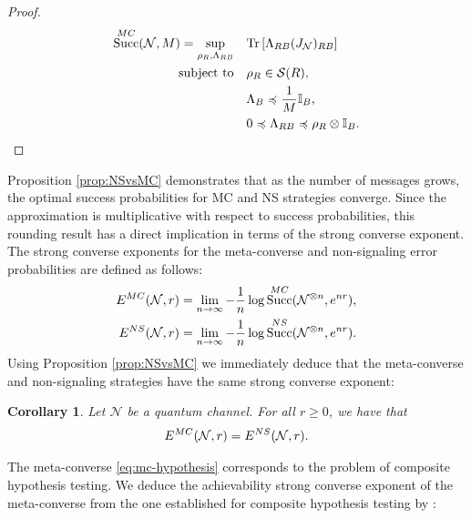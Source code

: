 \documentclass[a4paper,onecolumn,11pt,accepted=2025-10-01]{quantumarticle}
\newtheorem{cor}[theorem]{Corollary}
\DeclareMathOperator{\suc}{Succ}
\newcommand*{\cN}{\mathcal{N}}
\newcommand*{\cS}{\mathcal{S}}
\newcommand*{\tr}[1]{\mathrm{Tr}\left[#1\right]}
\newcommand*{\mle}{\preccurlyeq}
\begin{document}
\begin{proof}
\begin{align}
    \suc^{\rm{MC}}(\cN, M) = \sup_{\rho_R, \Lambda_{RB}} \quad & \tr{\Lambda_{RB} (J_{\cN})_{RB}} \notag \\
\text{subject to} \quad
& \rho_R \in \cS(R), \notag \\
& \Lambda_B \mle   \frac{1}{M} \mathbb{I}_B, \notag \\
& 0 \mle \Lambda_{RB} \mle  \rho_R \otimes \mathbb{I}_B.
\end{align}
\end{proof}
Proposition \ref{prop:NSvsMC} demonstrates that as the number of messages grows, the optimal success probabilities for MC and NS strategies converge. Since the approximation is multiplicative with respect to success probabilities, this rounding result has a direct implication  in terms of the strong converse exponent. The strong converse exponents for the meta-converse and non-signaling error probabilities are defined as follows:
\begin{align}
E^{\rm{MC}}(\cN, r) &= \lim_{n\rightarrow \infty } - \frac{1}{n}\log \suc^{\rm{MC}}(\cN^{\otimes n}, e^{nr}),
 \\E^{\rm{NS}}(\cN, r) &= \lim_{n\rightarrow \infty } - \frac{1}{n}\log\suc^{\rm{NS}}(\cN^{\otimes n}, e^{nr}).
\end{align}
Using Proposition \ref{prop:NSvsMC} we immediately deduce that the meta-converse and  non-signaling strategies have  the same strong converse exponent:

\begin{cor}\label{cor:SCE-MC-NS-pre}
    Let $\cN$ be a quantum channel. For all $r\ge 0$, we have  that
    \begin{align}
   E^{\rm{MC}}(\cN, r)= E^{\rm{NS}}(\cN, r). 
\end{align}
\end{cor}

The meta-converse \eqref{eq:mc-hypothesis} corresponds to the problem of composite hypothesis testing. We deduce the achievability strong converse exponent of the meta-converse from the one established for composite hypothesis testing by \cite{Hayashi2016Oct}:
\end{document}
